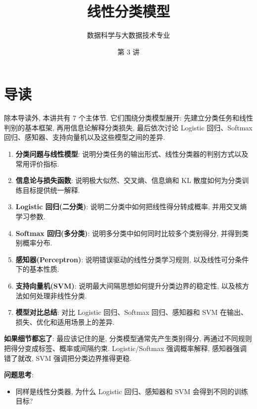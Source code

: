 \documentclass{../nndlcourse}
\begin{document}
\title{线性分类模型}
\author{数据科学与大数据技术专业}
\date{第 3 讲  }
\maketitle

\section{导读}

除本导读外, 本讲共有 7 个主体节. 它们围绕分类模型展开: 先建立分类任务和线性判别的基本框架, 再用信息论解释分类损失, 最后依次讨论 Logistic 回归、Softmax 回归、感知器、支持向量机以及这些模型之间的差异.

\begin{enumerate}
    \item \textbf{分类问题与线性模型}: 说明分类任务的输出形式、线性分类器的判别方式以及常用评价指标.
    \item \textbf{信息论与损失函数}: 说明极大似然、交叉熵、信息熵和 KL 散度如何为分类训练目标提供统一解释.
    \item \textbf{Logistic 回归(二分类)}: 说明二分类中如何把线性得分转成概率, 并用交叉熵学习参数.
    \item \textbf{Softmax 回归(多分类)}: 说明多分类中如何同时比较多个类别得分, 并得到类别概率分布.
    \item \textbf{感知器(Perceptron)}: 说明错误驱动的线性分类学习规则, 以及线性可分条件下的基本性质.
    \item \textbf{支持向量机(SVM)}: 说明最大间隔思想如何提升分类边界的稳定性, 以及核方法如何处理非线性分类.
    \item \textbf{模型对比总结}: 对比 Logistic 回归、Softmax 回归、感知器和 SVM 在输出、损失、优化和适用场景上的差异.
\end{enumerate}

\textbf{如果细节都忘了}: 最应该记住的是, 分类模型通常先产生类别得分, 再通过不同规则把得分变成标签、概率或间隔约束. Logistic/Softmax 强调概率解释, 感知器强调错了就改, SVM 强调把分类边界推得更稳.

\textbf{问题思考}:
\begin{itemize}
    \item 同样是线性分类器, 为什么 Logistic 回归、感知器和 SVM 会得到不同的训练目标?
\end{itemize}
\end{document}
